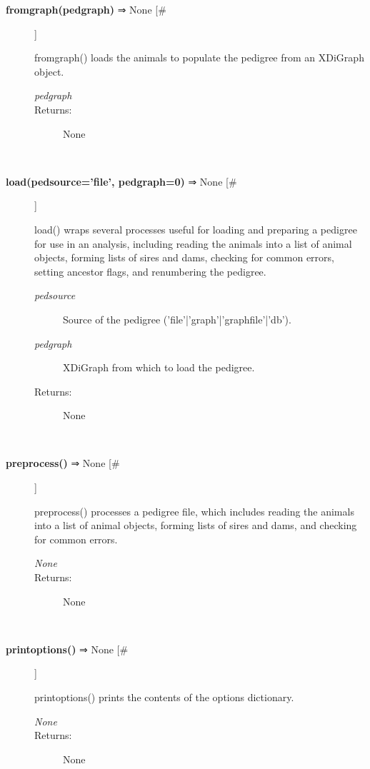 \documentclass{article}
\begin{document}
\begin{description}
\item[\textbf{fromgraph(pedgraph)} ⇒ None [\#]
]
\par fromgraph() loads the animals to populate the pedigree from an
XDiGraph object.
\begin{description}
\item[\textit{pedgraph}
]

\item[Returns:
]
None
\end{description}\\

\item[\textbf{load(pedsource='file', pedgraph=0)} ⇒ None [\#]
]
\par load() wraps several processes useful for loading and preparing a pedigree for
use in an analysis, including reading the animals into a list of animal objects,
forming lists of sires and dams, checking for common errors, setting ancestor
flags, and renumbering the pedigree.
\begin{description}
\item[\textit{pedsource}
]
Source of the pedigree ('file'|'graph'|'graphfile'|'db').
\item[\textit{pedgraph}
]
XDiGraph from which to load the pedigree.
\item[Returns:
]
None
\end{description}\\

\item[\textbf{preprocess()} ⇒ None [\#]
]
\par preprocess() processes a pedigree file, which includes reading the animals
into a list of animal objects, forming lists of sires and dams, and checking for
common errors.
\begin{description}
\item[\textit{None}
]

\item[Returns:
]
None
\end{description}\\

\item[\textbf{printoptions()} ⇒ None [\#]
]
\par printoptions() prints the contents of the options dictionary.
\begin{description}
\item[\textit{None}
]

\item[Returns:
]
None
\end{description}\\


\end{description}
\end{document}
